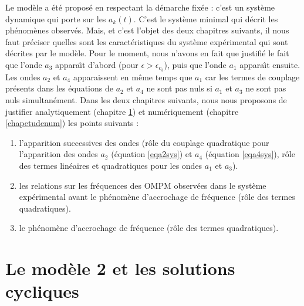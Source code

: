 \documentclass{book}
\begin{document}
Le mod\`ele a \'et\'e propos\'e en respectant la d\'emarche fix\'ee :
c'est un syst\`eme dynamique qui porte sur les $a_k(t)$. C'est le
syst\`eme minimal qui d\'ecrit les ph\'enom\`enes observ\'es.
Mais, et c'est l'objet des deux chapitres suivants, il nous faut
pr\'eciser quelles sont les caract\'eristiques du syst\`eme
exp\'erimental qui sont d\'ecrites par le mod\`ele. Pour le moment,
nous n'avons en fait que justifi\'e le fait que l'onde $a_3$ appara\^\i t
d'abord (pour $\epsilon>\epsilon_{c_3}$), puis que l'onde $a_1$
appara\^\i t ensuite. Les ondes $a_2$ et $a_4$ apparaissent en m\^eme
temps que $a_1$ car les termes de couplage pr\'esents dans les
\'equations de $a_2$ et $a_4$ ne sont pas nuls si $a_1$ et $a_3$ ne
sont pas nuls simultan\'ement.
Dans les deux chapitres suivants, nous nous proposons de justifier
analytiquement (chapitre  \ref{chapsolcyc}) et num\'eriquement
(chapitre \ref{chapetudenum}) les points suivants :
\begin{enumerate}
\item l'apparition successives des ondes (r\^ole du couplage quadratique
pour 
l'apparition des ondes $a_2$ (\'equation \ref{eqa2sys}) et $a_4$
(\'equation \ref{eqa4sys}), r\^ole des termes 
lin\'eaires et quadratiques pour  
les ondes $a_1$ et $a_3$).
\item les relations sur les fr\'equences des OMPM observ\'ees dans le
syst\`eme exp\'erimental avant le ph\'enom\`ene d'accrochage de
fr\'equence (r\^ole des termes quadratiques).
\item le ph\'enom\`ene d'accrochage de fr\'equence (r\^ole des termes
quadratiques). 
\end{enumerate}




\chapter{Le mod\`ele 2 et les solutions cycliques}\label{chapsolcyc}
\end{document}
